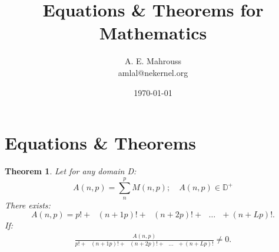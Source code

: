\documentclass[10pt, twocolumn]{article}
\title{%
  \vspace{-1.5em}%
  \large\textbf{Equations \& Theorems for Mathematics}%
}
\author{A. E. Mahrouss\\amlal@nekernel.org}
\date{\today}
\theoremstyle{plain}
\newtheorem{theorem}{Theorem}[section]
\theoremstyle{definition}
\theoremstyle{remark}
\begin{document}
\twocolumn[{%
  \maketitle
  \vspace{-0.5em}
  \vspace{0.8em}
  \rule{\linewidth}{0.4pt}
  \vspace{1em}
}]


\section{Equations \& Theorems}

\begin{theorem}
Let for any domain D:
\begin{equation}
    A(n, p) = \sum_{n}^{p} M(n, p); \quad A(n, p) \in \mathbb{D}^{+}
\end{equation}
There exists:
\begin{equation}
    A(n, p) = p! + \text{ } (n+1p)! + \text{ } (n+2p)! + \text{ } \dots \text{ } + (n+Lp)!.
\end{equation}
If:
\begin{align*}
	\frac{A(n, p)}{p! + \text{ } (n+1p)! + \text{ } (n+2p)! + \text{ } \dots \text{ } + (n+Lp)!} \neq 0.
\end{align*}
\end{theorem}

\nocite{*}



\end{document}
